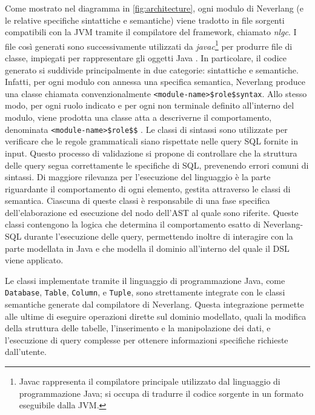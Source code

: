 \documentclass[12pt,a4paper,openright,twoside]{book}
\begin{document}
Come mostrato nel diagramma in \cref{fig:architecture}, ogni modulo di Neverlang (e le relative specifiche sintattiche e semantiche) 
viene tradotto in file sorgenti compatibili con la \ac{JVM} tramite il compilatore del framework, chiamato \textit{nlgc}. I file così 
generati sono successivamente utilizzati da \textit{javac}\footnote{Javac rappresenta il compilatore principale utilizzato dal 
linguaggio di programmazione Java; si occupa di tradurre il codice sorgente in un formato eseguibile dalla JVM.} per produrre file 
di classe, impiegati per rappresentare gli oggetti Java \cite[p. 19]{Vacchi2015}. In particolare, il codice generato si suddivide 
principalmente in due categorie: sintattiche e semantiche. Infatti, per ogni modulo con annessa una specifica semantica, Neverlang 
produce una classe chiamata convenzionalmente \texttt{<module-name>\$role\$syntax}. Allo stesso modo, per ogni ruolo indicato e per 
ogni non terminale definito all'interno del modulo, viene prodotta una classe atta a descriverne il comportamento, denominata 
\texttt{<module-name>\$role\$<role-name>\$<node-number>} \cite[pp. 21-22]{Vacchi2015}. Le classi di sintassi sono utilizzate per 
verificare che le regole grammaticali siano rispettate nelle query \ac{SQL} fornite in input. Questo processo di validazione si 
propone di controllare che la struttura delle query segua correttamente le specifiche di \ac{SQL}, prevenendo errori comuni di 
sintassi. Di maggiore rilevanza per l’esecuzione del linguaggio è la parte riguardante il comportamento di ogni elemento, gestita 
attraverso le classi di semantica. Ciascuna di queste classi è responsabile di una fase specifica dell’elaborazione ed esecuzione del 
nodo dell’\ac{AST} al quale sono riferite. Queste classi contengono la logica che determina il comportamento esatto di Neverlang-SQL 
durante l’esecuzione delle query, permettendo inoltre di interagire con la parte modellata in Java e che modella il dominio 
all'interno del quale il DSL viene applicato.

Le classi implementate tramite il linguaggio di programmazione Java, come \texttt{Database}, \texttt{Table}, \texttt{Column}, e \texttt{Tuple}, sono strettamente 
integrate con le classi semantiche generate dal compilatore di Neverlang. Questa integrazione permette alle ultime di eseguire 
operazioni dirette sul dominio modellato, quali la modifica della struttura delle tabelle, l’inserimento e la manipolazione dei dati, 
e l’esecuzione di query complesse per ottenere informazioni specifiche richieste dall’utente.
\end{document}
